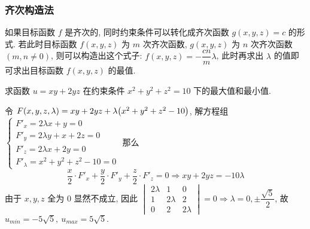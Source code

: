 \subsubsection{齐次构造法}

如果目标函数 $f$ 是齐次的, 同时约束条件可以转化成齐次函数 $g(x,y,z)=c$ 的形式.
若此时目标函数 $f(x,y,z)$ 为 $m$ 次齐次函数, $g(x,y,z)$ 为 $n$ 次齐次函数 $(m,n\neq0)$, 
则可以构造出这个式子: $f(x,y,z)=-\dfrac{cn}{m}\lambda$, 此时再求出 $\lambda$ 的值即可求出目标函数 $f(x,y,z)$ 的最值.

\begin{example}[2010 数三]
    求函数 $u=xy+2yz$ 在约束条件 $x^2+y^2+z^2=10$ 下的最大值和最小值.
\end{example}
\begin{solution}
    令 $F(x,y,z,\lambda)=xy+2yz+\lambda\qty(x^2+y^2+z^2-10)$, 解方程组 
    $\begin{cases}
        F'_x=2 \lambda x + y=0\\ 
        F'_y=2 \lambda y + x + 2 z=0\\ 
        F'_z=2 \lambda x + 2y=0\\ 
        F'_\lambda=x^{2} + y^{2} + z^{2} - 10=0
    \end{cases}$ 那么 $$\dfrac{x}{2}\cdot F'_x+\dfrac{y}{2}\cdot F'_y+\dfrac{z}{2}\cdot F'_z=0\Rightarrow xy+2yz=-10\lambda$$
    由于 $x,y,z$ 全为 $0$ 显然不成立, 因此 $\begin{vmatrix}
        2\lambda&1&0 \\ 1&2\lambda&2 \\ 0&2&2\lambda
    \end{vmatrix}=0\Rightarrow \lambda=0,\pm\dfrac{\sqrt{5}}{2}$, 故 $u_{min}=-5\sqrt{5},~u_{max}=5\sqrt{5}.$
\end{solution}


